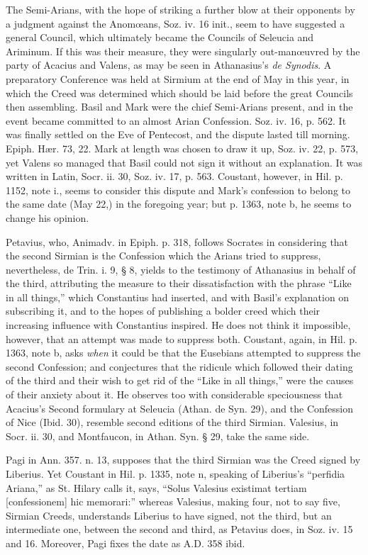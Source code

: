 The Semi-Arians, with the hope of striking a further blow at
their opponents by a judgment against the Anomœans, Soz. iv. 16
init., seem to have suggested a general Council, which ultimately
became the Councils of Seleucia and Ariminum. If this was their
measure, they were singularly out-manœuvred by the party of Acacius
and Valens, as may be seen in Athanasius's \emph{de Synodis}. A
preparatory Conference was held at Sirmium at the end of May in this
year, in which the Creed was determined which should be laid before
the great Councils then assembling. Basil and Mark were the chief
Semi-Arians present, and in the event became committed to an almost
Arian Confession. Soz. iv. 16, p. 562. It was finally settled on the
Eve of Pentecost, and the dispute lasted till morning. Epiph. Hær.
73, 22. Mark at length was chosen to draw it up, Soz. iv. 22, p. 573,
yet Valens so managed that Basil could not sign it without an
explanation. It was written in Latin, Socr. ii. 30, Soz. iv. 17, p.
563. Coustant, however, in Hil. p. 1152, note i., seems to consider
this dispute and Mark's confession to belong to the same date (May
22,) in the foregoing year; but p. 1363, note b, he seems to change
his opinion.

Petavius, who, Animadv. in Epiph. p. 318, follows Socrates in
considering that the second Sirmian is the Confession which the Arians
tried to suppress, nevertheless, de Trin. i. 9, § 8, yields to the
testimony of Athanasius in behalf of the third, attributing the
measure to their dissatisfaction with the phrase ``Like in all
things,'' which Constantius had inserted, and with Basil's
explanation on subscribing it, and to the hopes of publishing a bolder
creed which their increasing influence with Constantius inspired. He
does not think it impossible, however, that an attempt was made to
suppress both. Coustant, again, in Hil. p. 1363, note b, asks \emph{when}
it could be that the Eusebians attempted to suppress the second
Confession; and conjectures that the ridicule which followed their
dating of the third and their wish to get rid of the ``Like in all
things,'' were the causes of their anxiety about it. He
observes too with considerable speciousness that Acacius's Second
formulary at Seleucia (Athan. de Syn. 29), and the Confession of Nice
(Ibid. 30), resemble second editions of the third Sirmian. Valesius,
in Socr. ii. 30, and Montfaucon, in Athan. Syn. § 29, take the same
side.

Pagi in Ann. 357. n. 13, supposes that the third Sirmian was the
Creed signed by Liberius. Yet Coustant in Hil. p. 1335, note n,
speaking of Liberius's ``perfidia Ariana,'' as St. Hilary
calls it, says, ``Solus Valesius existimat tertiam [confessionem]
hic memorari:'' whereas Valesius, making four, not to say five,
Sirmian Creeds, understands Liberius to have signed, not the third,
but an intermediate one, between the second and third, as Petavius
does, in Soz. iv. 15 and 16. Moreover, Pagi fixes the date as A.D.
358 ibid.

